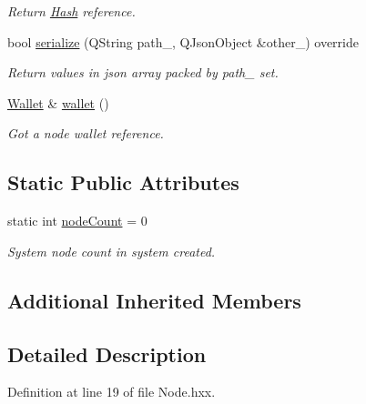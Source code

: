 \begin{DoxyCompactItemize}
\begin{DoxyCompactList}\small\item\em Return \mbox{\hyperlink{classeven_1_1_hash}{Hash}} reference. \end{DoxyCompactList}\item 
\mbox{\label{classeven_1_1_node_a574cef1c009ab0ad661e7a7d7d4377cf}} 
bool \mbox{\hyperlink{classeven_1_1_node_a574cef1c009ab0ad661e7a7d7d4377cf}{serialize}} (Q\+String path\+\_\+, Q\+Json\+Object \&other\+\_\+) override
\begin{DoxyCompactList}\small\item\em Return values in json array packed by path\+\_\+ set. \end{DoxyCompactList}\item 
\mbox{\label{classeven_1_1_node_a270700dad3a700245d36659f630affec}} 
\mbox{\hyperlink{classeven_1_1_wallet}{Wallet}} \& \mbox{\hyperlink{classeven_1_1_node_a270700dad3a700245d36659f630affec}{wallet}} ()
\begin{DoxyCompactList}\small\item\em Got a node wallet reference. \end{DoxyCompactList}\end{DoxyCompactItemize}
\subsection*{Static Public Attributes}
\begin{DoxyCompactItemize}
\item 
static int \mbox{\hyperlink{classeven_1_1_node_a5497ed023382d8e370ad72d758587927}{node\+Count}} = 0
\begin{DoxyCompactList}\small\item\em System node count in system created. \end{DoxyCompactList}\end{DoxyCompactItemize}
\subsection*{Additional Inherited Members}


\subsection{Detailed Description}


Definition at line 19 of file Node.\+hxx.



